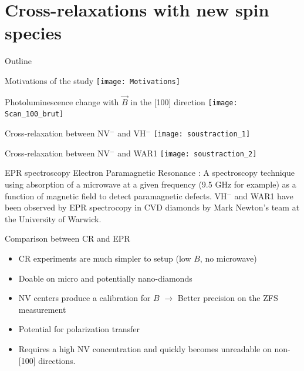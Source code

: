 \documentclass{beamer}
\begin{document}
\section{Cross-relaxations with new spin species}
\begin{frame}{Outline}
\tableofcontents[currentsection]
\end{frame}
\begin{frame}{Motivations of the study}
\texttt{[image: Motivations]}
\end{frame}
\begin{frame}{Photoluminescence change with $\vec B$ in the [100] direction}
\centering
\texttt{[image: Scan\_100\_brut]}
\end{frame}
\begin{frame}{Cross-relaxation between NV$^-$ and VH$^-$}
\texttt{[image: soustraction\_1]}
\end{frame}
\begin{frame}{Cross-relaxation between NV$^-$ and WAR1}
\texttt{[image: soustraction\_2]}
\end{frame}
\begin{frame}{EPR spectroscopy}
Electron Paramagnetic Resonance : A spectroscopy technique using absorption of a microwave at a given frequency (9.5 GHz for example) as a function of magnetic field to detect paramagnetic defects.
\bigbreak
VH$^-$ and WAR1  have been observed by EPR spectrocopy in CVD diamonds by Mark Newton's team at the University of Warwick.
\end{frame}
\begin{frame}{Comparison between CR and EPR}
\begin{itemize}
\item CR experiments are much simpler to setup (low $B$, no microwave)
\item Doable on micro and potentially nano-diamonds
\item NV centers produce a calibration for $B$ $\to$ Better precision on the ZFS measurement
\item Potential for polarization transfer
\bigbreak
\bigbreak
\item Requires a high NV concentration and quickly becomes unreadable on non-[100] directions.
\end{itemize}
\end{frame}
\end{document}
